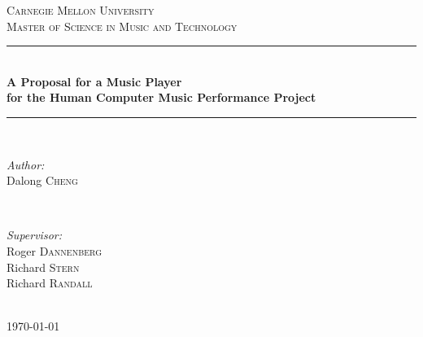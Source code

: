 \documentclass[12pt]{article} %
\begin{document}

\begin{titlepage}

\newcommand{\HRule}{\rule{\linewidth}{0.5mm}} %

\center %

\textsc{\LARGE Carnegie Mellon University}\\[1.5cm] %
\textsc{\Large Master of Science in Music and Technology}\\[0.5cm] %

\HRule \\[0.4cm]
{\large \bfseries A Proposal for a Music Player \\ for the Human Computer Music Performance Project}\\[0.4cm] %
\HRule \\[1.5cm]

\begin{minipage}{0.4\textwidth}
\begin{flushleft} \large
\emph{Author:}\\
Dalong \textsc{Cheng} %
\end{flushleft}
\end{minipage}
~
\begin{minipage}{0.4\textwidth}
\begin{flushright} \large
\emph{Supervisor:} \\
Roger \textsc{Dannenberg} \\ %
Richard \textsc{Stern} \\
Richard \textsc{Randall}
\end{flushright}
\end{minipage}\\[4cm]

{\large \today}\\[3cm] %


\vfill %



\end{titlepage}
\end{document}
